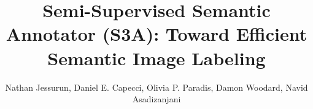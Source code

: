\documentclass[journal]{vgtc}                %
\title{Semi-Supervised Semantic Annotator (S3A): Toward Efficient Semantic Image Labeling}
\author{Nathan Jessurun, Daniel E. Capecci, Olivia P. Paradis, Damon Woodard, Navid Asadizanjani}
\begin{document}

\maketitle








\FloatBarrier
%

%
%
%

\end{document}
